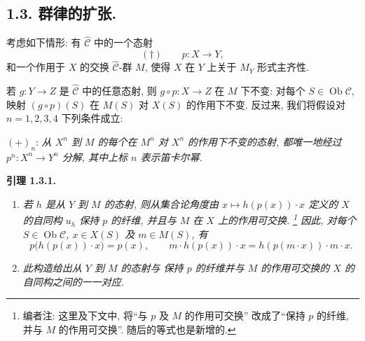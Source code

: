 
\setcounter{footnote}{45}

\subsection*{1.3. 群律的扩张.}
考虑如下情形: 有 \(\widehat{\mathscr C}\) 中的一个态射
\[
 (\dagger)\qquad p:X\longrightarrow Y,
\]
和一个作用于 \(X\) 的交换 \(\widehat{\mathscr C}\)-群 \(M\),
使得 \(X\) 在 \(Y\) 上关于 \(M_Y\) 形式主齐性.

若 \(g:Y\to Z\) 是 \(\widehat{\mathscr C}\) 中的任意态射,
则 \(g\circ p:X\to Z\) 在 \(M\) 下不变:
对每个 \(S\in\operatorname{Ob}\mathscr C\),
映射 \((g\circ p)(S)\) 在 \(M(S)\) 对 \(X(S)\) 的作用下不变.
反过来, 我们将假设对 \(n=1,2,3,4\) 下列条件成立:

\medskip
\noindent\((+)_{n}\): \textit{从 \(X^n\) 到 \(M\) 的每个在
\(M^n\) 对 \(X^n\) 的作用下不变的态射, 都唯一地经过
\(p^n:X^n\to Y^n\) 分解, 其中上标 \(n\) 表示笛卡尔幂.}

\medskip
\noindent{}\textbf{引理 1.3.1.}
\begin{enumerate}
 \item[(i)] \textit{若 \(h\) 是从 \(Y\) 到 \(M\) 的态射,
 则从集合论角度由 \(x\mapsto h(p(x))\cdot x\) 定义的
 \(X\) 的自同构 \(u_h\) 保持 \(p\) 的纤维,
 并且与 \(M\) 在 \(X\) 上的作用可交换.
 \footnote{编者注: 这里及下文中, 将``与 \(p\) 及 \(M\) 的作用可交换''
 改成了``保持 \(p\) 的纤维, 并与 \(M\) 的作用可交换''.
 随后的等式也是新增的.} 因此, 对每个
 \(S\in\operatorname{Ob}\mathscr C\), \(x\in X(S)\) 及
 \(m\in M(S)\), 有}
 \[
  p\bigl(h(p(x))\cdot x\bigr)=p(x),
  \qquad
  m\cdot h(p(x))\cdot x
   =h(p(m\cdot x))\cdot m\cdot x.
 \]

 \item[(ii)] \textit{此构造给出从 \(Y\) 到 \(M\) 的态射与
 保持 \(p\) 的纤维并与 \(M\) 的作用可交换的 \(X\) 的自同构之间的一一对应.}
\end{enumerate}

